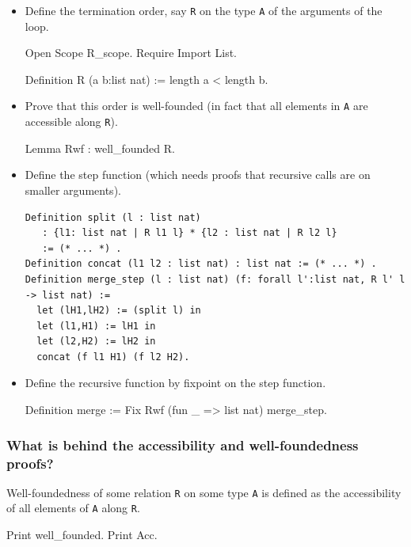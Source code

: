 \documentclass[a4paper,pdftex]{article}
\def\Question#1{\stepcounter{question}\subsubsection{#1}}
\begin{document}
\begin{itemize}

\item Define the termination order, say {\tt R} on the type {\tt A} of
the arguments of the loop.

\begin{coq_eval}
Open Scope R_scope.
Require Import List.
\end{coq_eval}

\begin{coq_example*}
Definition R (a b:list nat) := length a < length b.
\end{coq_example*}

\item Prove that this order is well-founded (in fact that all elements in {\tt A} are accessible along {\tt R}).

\begin{coq_example*}
Lemma Rwf : well_founded R.
\end{coq_example*}

\item Define the step function (which needs proofs that recursive
calls are on smaller arguments).

\begin{verbatim}
Definition split (l : list nat) 
   : {l1: list nat | R l1 l} * {l2 : list nat | R l2 l}
   := (* ... *) .
Definition concat (l1 l2 : list nat) : list nat := (* ... *) .
Definition merge_step (l : list nat) (f: forall l':list nat, R l' l -> list nat) :=
  let (lH1,lH2) := (split l) in
  let (l1,H1) := lH1 in
  let (l2,H2) := lH2 in
  concat (f l1 H1) (f l2 H2).
\end{verbatim}

\item Define the recursive function by fixpoint on the step function.

\begin{coq_example*}
Definition merge := Fix Rwf (fun _ => list nat) merge_step.
\end{coq_example*}

\end{itemize}

\Question{What is behind the accessibility and well-foundedness proofs?}

 Well-foundedness of some relation {\tt R} on some type {\tt A}
is defined as the accessibility of all elements of {\tt A} along {\tt R}.

\begin{coq_example}
Print well_founded.
Print Acc.
\end{coq_example}
\end{document}
